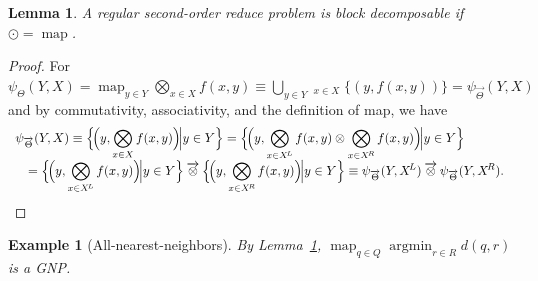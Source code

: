 \documentclass{article}
\newtheorem{lemma}{Lemma}
\newtheorem{example} {Example}
\newcommand{\killspace}{\vspace{-0.08in}}
\newcommand{\GNP}[1][\psi]{{#1}_{\Theta}}
\newcommand{\GNPvec}[1][\psi]{{#1}_{\overrightarrow{\Theta}}}
\newcommand{\otimesvec}{\mathbin{\overrightarrow{\otimes}}}
\newcommand{\bigotimesvec}{\mathop{\overrightarrow{\bigotimes}}}
\DeclareMathOperator*{\argmin}{argmin}
\DeclareMathOperator*{\map}{map}
\newcommand{\kdleft}[1]{#1^{\!L}}
\newcommand{\kdright}[1]{#1^{\!R}}
\begin{document}
\begin{lemma}\label{lem:map}
  A regular second-order reduce problem is block decomposable if
  $\odot = \map$.
\end{lemma}
\killspace
\begin{proof}
  For $\GNP(Y,X) = \map_{y \in Y} \bigotimes_{x \in X} f(x,y) \equiv
  \bigcup_{y \in Y} \bigotimesvec_{x \in X} \{(y,f(x,y))\} =
  \GNPvec(Y,X)$ and by commutativity, associativity, and the
  definition of map, we have
  \[ \begin{array}{ll}
    \multicolumn{2}{l}{\displaystyle \GNPvec(Y,X) \equiv \Big\{ \!\Big( y,\bigotimes_{x \in X} f(x,y) \Big)\! \Big| y \in Y \Big\} = \Big\{ \!\Big( y,\bigotimes_{x \in \kdleft{X}} f(x,y) \otimes \bigotimes_{x \in \kdright{X}} f(x,y) \Big)\! \Big| y \in Y \Big\}} \\
    & \displaystyle = \Big\{ \!\Big( y,\bigotimes_{x \in \kdleft{X}} f(x,y) \Big)\! \Big| y \in Y \Big\} \otimesvec \Big\{ \!\Big( y,\bigotimes_{x \in \kdright{X}} f(x,y) \Big)\! \Big| y \in Y \Big\} \equiv \GNPvec(Y,\kdleft{X}) \otimesvec \GNPvec(Y,\kdright{X}).
  \end{array} \]
\end{proof}

\begin{example}[All-nearest-neighbors]
  By Lemma~\ref{lem:map}, $\map_{q \in Q} \argmin_{r \in R} d(q,r)$ is
  a GNP.
\end{example}

\end{document}
